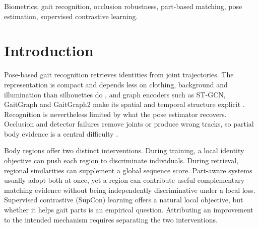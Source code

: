 \documentclass[journal]{IEEEtran}
\begin{document}
\begin{IEEEkeywords}
Biometrics, gait recognition, occlusion robustness, part-based matching, pose estimation, supervised contrastive learning.
\end{IEEEkeywords}

\section{Introduction}
\label{sec:introduction}

Pose-based gait recognition retrieves identities from joint trajectories. The
representation is compact and depends less on clothing, background and
illumination than silhouettes do \cite{liao2020posegait}, and graph encoders
such as ST-GCN, GaitGraph and GaitGraph2 make its spatial and temporal
structure explicit \cite{yan2018stgcn,teepe2021gaitgraph,teepe2022gaitgraph2}.
Recognition is nevertheless limited by what the pose estimator recovers.
Occlusion and detector failures remove joints or produce wrong tracks, so
partial body evidence is a central difficulty \cite{li2024survey,huang2024occluded}.

Body regions offer two distinct interventions. During training, a local
identity objective can push each region to discriminate individuals. During
retrieval, regional similarities can supplement a global sequence score.
Part-aware systems usually adopt both at once, yet a region can contribute
useful complementary matching evidence without being independently
discriminative under a local loss. Supervised contrastive (SupCon) learning
\cite{khosla2020supervised} offers a natural local objective, but whether it
helps gait parts is an empirical question. Attributing an improvement to the
intended mechanism requires separating the two interventions.
\end{document}

